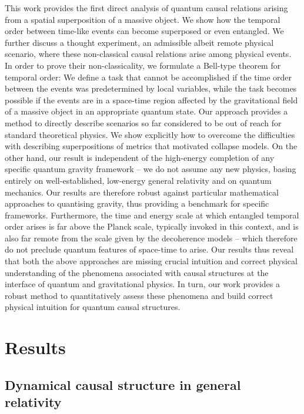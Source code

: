 \documentclass[a4paper,11pt]{article}
\begin{document}
This work provides the first direct analysis of quantum causal relations arising from a spatial superposition of a massive object.
We show how the temporal order between time-like events can become superposed or even entangled. We further discuss a thought experiment, an admissible albeit remote physical scenario, where these non-classical causal relations arise among physical events. In order to prove their non-classicality, we formulate a Bell-type theorem for temporal order: We define a task that cannot be accomplished if the time order between the events was predetermined by  local variables, while the task becomes possible if the events are in a space-time region affected by the gravitational field of a massive object in an appropriate quantum state.
%
Our approach provides a method to directly describe scenarios so far considered to be out of reach for standard theoretical physics. 
We show explicitly how to overcome the difficulties with describing superpositions of metrics that motivated collapse models. On the other hand, our result is independent of the high-energy completion of any specific quantum gravity framework --  we do not assume any new physics, basing entirely on well-established, low-energy general relativity and on quantum mechanics. Our results are therefore robust against particular mathematical approaches to quantising gravity, thus providing a benchmark for specific frameworks. Furthermore, the time and energy scale at which entangled temporal order arises is far above the Planck scale, typically invoked in this context, and is also far remote from the scale given by the decoherence models -- which therefore do not preclude quantum features of space-time to arise. Our results thus reveal that both the above approaches are missing crucial intuition and correct physical understanding of the phenomena associated with causal structures at the interface of quantum and gravitational physics. In turn, our work provides  a robust method to quantitatively assess these phenomena and build correct physical intuition for quantum causal structures.

\section*{Results}
\subsection*{Dynamical causal structure in general relativity}
\label{sec:time_dilation}
\end{document}
